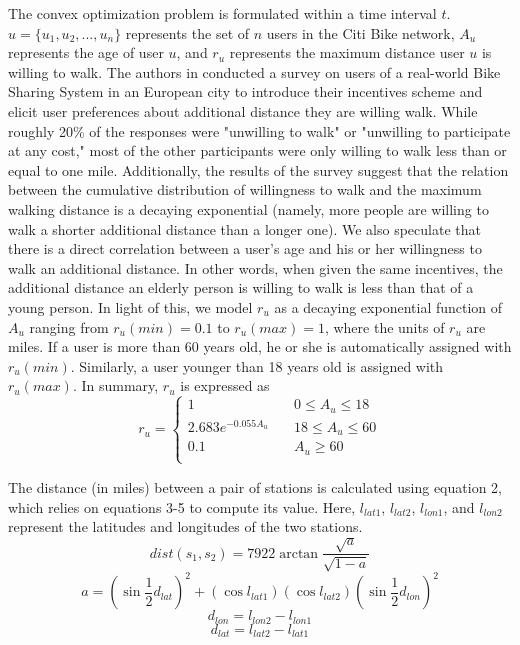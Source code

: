 \documentclass[times, 10pt,twocolumn]{article}
\begin{document}
The convex optimization problem is formulated within a time interval $t$. $u = \{u_1, u_2, ..., u_n\}$ represents the set of $n$ users in the Citi Bike network, $A_u$ represents the age of user $u$, and $r_u$ represents the maximum distance user $u$ is willing to walk. The authors in \cite{incentives} conducted a survey on users of a real-world Bike Sharing System in an European city to introduce their incentives scheme and elicit user preferences about additional distance they are willing walk. While roughly 20\% of the responses were "unwilling to walk" or "unwilling to participate at any cost," most of the other participants were only willing to walk less than or equal to one mile. Additionally, the results of the survey suggest that the relation between the cumulative distribution of willingness to walk and the maximum walking distance is a decaying exponential (namely, more people are willing to walk a shorter additional distance than a longer one). We also speculate that there is a direct correlation between a user's age and his or her willingness to walk an additional distance. In other words, when given the same incentives, the additional distance an elderly person is willing to walk is less than that of a young person. In light of this, we model $r_u$ as a decaying exponential function of $A_u$ ranging from $r_u(min) = 0.1$ to $r_u(max) = 1$, where the units of $r_u$ are miles. If a user is more than 60 years old, he or she is automatically assigned with $r_u(min)$. Similarly, a user younger than 18 years old is assigned with $r_u(max)$. In summary, $r_u$ is expressed as
\begin{equation}
r_u = \left\{
        \begin{array}{lll}
            1 & \quad 0 \leq A_u \leq 18 \\
            2.683e^{-0.055A_u} & \quad 18 \leq A_u \leq 60 \\
            0.1 & \quad A_u \geq 60 \\
        \end{array}
    \right.
\end{equation}

The distance (in miles) between a pair of stations is calculated using equation 2, which relies on equations 3-5 to compute its value. Here, $l_{lat1}$, $l_{lat2}$, $l_{lon1}$, and $l_{lon2}$ represent the latitudes and longitudes of the two stations.
\begin{equation}
dist(s_1,s_2) = 7922\arctan{\frac{\sqrt{a}}{\sqrt{1-a}}}
\end{equation}
\begin{equation}
a = (\sin{\frac{1}{2}d_{lat}})^2+(\cos{l_{lat1}})(\cos{l_{lat2}})(\sin{\frac{1}{2}d_{lon}})^2
\end{equation}
\begin{equation}
d_{lon} = l_{lon2} - l_{lon1}
\end{equation}
\begin{equation}
d_{lat} = l_{lat2} - l_{lat1}
\end{equation}
\end{document}
